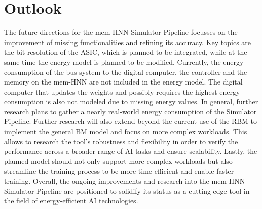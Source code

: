 \section{Outlook}
The future directions for the \ac{mem-HNN} Simulator Pipeline focusses on the improvement of missing functionalities and refining its accuracy. 
Key topics are the bit-resolution of the \ac{ASIC}, which is planned to be integrated, while at the same time the energy model is planned
to be modified.
Currently, the energy consumption of the bus system to the digital computer, the controller and the memory on the \ac{mem-HNN} 
are not included in the energy model.
The digital computer that updates the weights and possibly requires the highest energy consumption is also not modeled due to missing energy values.
In general, further research plans to gather a nearly real-world energy consumption of the Simulator Pipeline.
Further research will also extend beyond the current use of the \ac{RBM} to implement the general \ac{BM} model and focus on more complex workloads.
This allows to research the tool's robustness and flexibility in order to verify the performance across a broader range of AI tasks and ensure scalability.
Lastly, the planned model should not only support more complex workloads but also streamline the training process to be more time-efficient and enable faster training.
Overall, the ongoing improvements and research into the \ac{mem-HNN} Simulator Pipeline are positioned to solidify its status as a cutting-edge tool in the field of energy-efficient AI technologies.